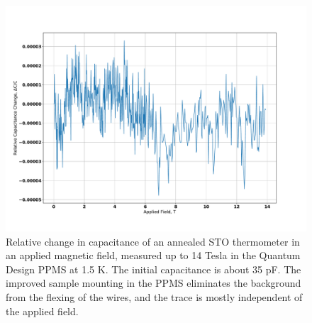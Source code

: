 \documentclass{thesis-umich}
\begin{document}
\begin{figure} \caption[Field Response of an Annealed STO Thermometer]{Relative change in capacitance of an annealed STO
	thermometer in an applied magnetic field, measured up to 14 Tesla in
the Quantum Design PPMS at 1.5 K. The initial capacitance is about 35 pF. The improved sample mounting in the PPMS eliminates
the background from the flexing of the wires, and the trace is mostly independent of the applied field.}
\label{fig:annealed_sto_field}
\includegraphics[width=\columnwidth]{figures/annealed_sto_dc_vs_b.pdf}
\end{figure}
\end{document}
